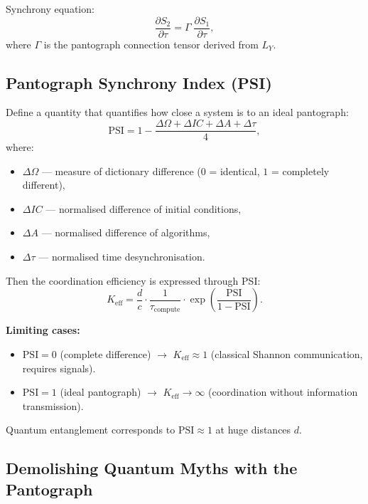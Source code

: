 \documentclass[12pt,a4paper]{article}
\begin{document}
	Synchrony equation:
	\[
	\frac{\partial S_2}{\partial \tau} = \Gamma \; \frac{\partial S_1}{\partial \tau},
	\]
	where \(\Gamma\) is the pantograph connection tensor derived from \(L_Y\).
	
	\subsection{Pantograph Synchrony Index (PSI)}
	
	Define a quantity that quantifies how close a system is to an ideal pantograph:
	\[
	\mathrm{PSI} = 1 - \frac{\Delta\Omega + \Delta IC + \Delta A + \Delta\tau}{4},
	\]
	where:
	\begin{itemize}
		\item \(\Delta\Omega\) — measure of dictionary difference (\(0\) = identical, \(1\) = completely different),
		\item \(\Delta IC\) — normalised difference of initial conditions,
		\item \(\Delta A\) — normalised difference of algorithms,
		\item \(\Delta\tau\) — normalised time desynchronisation.
	\end{itemize}
	
	Then the coordination efficiency is expressed through PSI:
	\[
	K_{\mathrm{eff}} = \frac{d}{c} \cdot \frac{1}{\tau_{\mathrm{compute}}} \cdot \exp\!\left( \frac{\mathrm{PSI}}{1 - \mathrm{PSI}} \right).
	\]
	
	\textbf{Limiting cases:}
	\begin{itemize}
		\item \(\mathrm{PSI} = 0\) (complete difference) \(\to\) \(K_{\mathrm{eff}} \approx 1\) (classical Shannon communication, requires signals).
		\item \(\mathrm{PSI} = 1\) (ideal pantograph) \(\to\) \(K_{\mathrm{eff}} \to \infty\) (coordination without information transmission).
	\end{itemize}
	Quantum entanglement corresponds to \(\mathrm{PSI} \approx 1\) at huge distances \(d\).
	
	\subsection{Demolishing Quantum Myths with the Pantograph}
	
\end{document}
